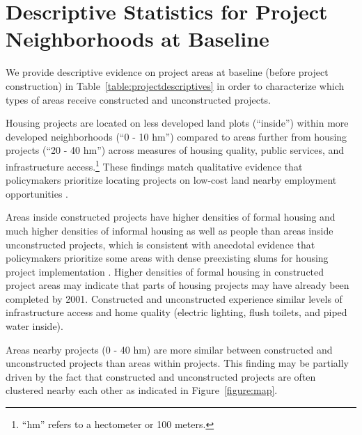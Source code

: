 \documentclass[12pt]{article}
\newcommand{\hmref}{
	``hm'' refers to a hectometer or 100 meters.
}
\begin{document}
\section{Descriptive Statistics for Project Neighborhoods at Baseline}\label{section:descriptives}


We provide descriptive evidence on project areas at baseline (before project construction) in Table~\ref{table:projectdescriptives} in order to characterize which types of areas receive constructed and unconstructed projects.

Housing projects are located on less developed land plots (``inside'') within more developed neighborhoods (``0 - 10 hm'') compared to areas further from housing projects (``20 - 40 hm'') across measures of housing quality, public services, and infrastructure access.\footnote{\hmref}  These findings match qualitative evidence that policymakers prioritize locating projects on low-cost land nearby employment opportunities \citep{beninterview}.

Areas inside constructed projects have higher densities of formal housing and much higher densities of informal housing as well as people than areas inside unconstructed projects, which is consistent with anecdotal evidence that policymakers prioritize some areas with dense preexisting slums for housing project implementation \citep{hofmeyr2008risk}.  Higher densities of formal housing in constructed project areas may indicate that parts of housing projects may have already been completed by 2001.  Constructed and unconstructed experience similar levels of infrastructure access and home quality (electric lighting, flush toilets, and piped water inside).  

Areas nearby projects (0 - 40 hm) are more similar between constructed and unconstructed projects than areas within projects.  This finding may be partially driven by the fact that constructed and unconstructed projects are often clustered nearby each other as indicated in Figure~\ref{figure:map}.



\end{document}
